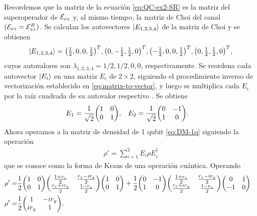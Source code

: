 Recordemos que la matriz de la ecuación \eqref{eq:QC-ex2-SR}
es la matriz del superoperador de $\mathcal{E}_{xz}$ y, al mismo tiempo,
la matriz de Choi del canal $(\mathcal{E}_{xz}=\mathcal{E}_{xz}^R)$.  
Se calculan los autovectores $\ket{E_{1,2,3,4}}$ de 
la matriz de Choi y se obtienen
\begin{align}
\ket{E_{1,2,3,4}}=
\mqty(\frac{1}{2},0,0,\frac{1}{2})^T,
\mqty(0,-\frac{1}{2},\frac{1}{2},0)^T,
\mqty(-\frac{1}{2},0,0,\frac{1}{2})^T,
\mqty(0,\frac{1}{2},\frac{1}{2},0)^T,
\end{align}
cuyos autovalores son $\lambda_{1,2,3,4}=1/2,1/2,0,0$, respectivamente.
Se reordena cada autovector $\ket{E_i}$ en una matriz
$E_i$ de $2\times2$, siguiendo el procedimiento 
inverso de vectorización establecido en
\eqref{eq:matrix-to-vector}, y luego se multiplica cada $E_i$ por 
la raíz cuadrada de su autovalor respectivo . Se obtiene
\begin{align}
E_1&=
\frac{1}{\sqrt{2}}
\mqty(
1 & 0\\
0 & 1
),
&
E_2&=
\frac{1}{\sqrt{2}}
\mqty(
0 & -1\\
1 & 0
).
\end{align}
Ahora operamos a la matriz de densidad de 1 qubit 
\eqref{eq:DM-1q} siguiendo la operación
\begin{align}
\rho'=\sum_{i=1}^2E_i\rho E_i^{\dagger}
\label{eq:Kraus}
\end{align}
que se conoce como la forma de Kraus de una operación cuántica. 
Operando
\begin{align}
\rho'=&
\frac{1}{2}
\mqty(
1 & 0\\
0 & 1
)
\mqty(
\frac{1+r_z}{2}& \frac{r_x-ir_y}{2}\\
\frac{r_x+ir_y}{2} & \frac{1-r_z}{2}
)
\mqty(
1 & 0\\
0 & 1
)
+
\frac{1}{2}
\mqty(
0 & -1\\
1 & 0
)
\mqty(
\frac{1+r_z}{2}& \frac{r_x-ir_y}{2}\\
\frac{r_x+ir_y}{2} & \frac{1-r_z}{2}
)
\mqty(
0 & 1\\
-1 & 0
)&
\nonumber\\
\rho'=&
\frac{1}{2}
\mqty(
1 & -ir_y\\
ir_y & 1
).
\label{eq:QC-ex2-KR}
\end{align}
